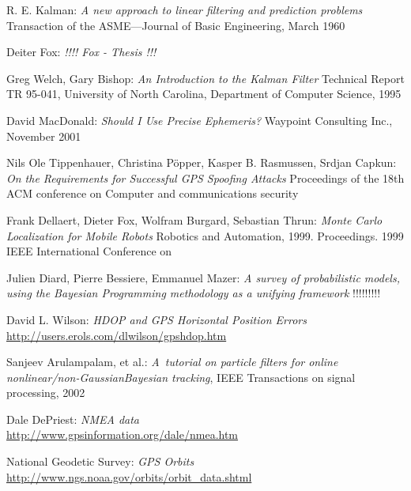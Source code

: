 \clearpage
{}
\begin{thebibliography}{99}


R. E. Kalman:
\emph{A new approach to linear filtering and prediction problems}
Transaction of the ASME—Journal of Basic Engineering, March 1960

Deiter Fox:
\emph{!!!! Fox - Thesis !!!}

Greg Welch,
Gary Bishop:
\emph{An Introduction to the Kalman Filter}
Technical Report TR 95-041, University of North Carolina,
Department of Computer Science, 1995

David MacDonald:
\emph{Should I Use Precise Ephemeris?}
Waypoint Consulting Inc.,
November 2001

Nils Ole Tippenhauer,
Christina Pöpper,
Kasper B. Rasmussen,
Srdjan Capkun:
\emph{On the Requirements for Successful GPS Spoofing Attacks}
Proceedings of the 18th ACM conference on Computer and communications security

Frank Dellaert,
Dieter Fox,
Wolfram Burgard,
Sebastian Thrun:
\emph{Monte Carlo Localization for Mobile Robots}
Robotics and Automation, 1999. Proceedings. 1999 IEEE International Conference on

Julien Diard,
Pierre Bessiere,
Emmanuel Mazer:
\emph{A survey of probabilistic models, using the Bayesian Programming
methodology as a unifying framework}
!!!!!!!!!


David L. Wilson:
\emph{HDOP and GPS Horizontal Position Errors} \\
\url{http://users.erols.com/dlwilson/gpshdop.htm}

Sanjeev Arulampalam, et al.:
{\em A~tutorial on particle filters for online nonlinear/non-GaussianBayesian tracking},
IEEE Transactions on signal processing, 2002

Dale DePriest:
\emph{NMEA data} \\
\url{http://www.gpsinformation.org/dale/nmea.htm}

National Geodetic Survey:
\emph{GPS Orbits} \\
\url{http://www.ngs.noaa.gov/orbits/orbit_data.shtml}

\end{thebibliography}
